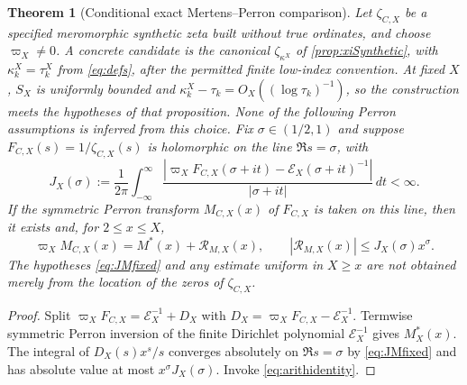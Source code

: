 \documentclass[11pt,reqno]{amsart}
\numberwithin{equation}{section}
\newtheorem{theorem}{Theorem}[section]
\begin{document}
\begin{theorem}[Conditional exact Mertens--Perron comparison]
\label{thm:PerronMfixed}
Let $\zeta_{C,X}$ be a specified meromorphic synthetic zeta
built without true ordinates, and choose $\varpi_X\ne0$.
A concrete candidate is the canonical $\zeta_{\kappa^X}$ of
\cref{prop:xiSynthetic}, with $\kappa_k^X=\tau_k^X$
from \eqref{eq:defs}, after the permitted finite low-index convention.
At fixed $X$, $S_X$ is uniformly bounded and
$\kappa_k^X-\tau_k=O_X((\log\tau_k)^{-1})$,
so the construction meets the hypotheses of that proposition.
None of the following Perron assumptions is inferred from this choice.
Fix $\sigma\in(1/2,1)$ and suppose
$F_{C,X}(s)=1/\zeta_{C,X}(s)$ is holomorphic on the line
$\Re s=\sigma$, with
\begin{equation}\label{eq:JMfixed}
 J_X(\sigma):=\frac1{2\pi}
 \int_{-\infty}^{\infty}
 \frac{|\varpi_X F_{C,X}(\sigma+it)-\mathscr E_X(\sigma+it)^{-1}|}
 {|\sigma+it|}\,dt<\infty.
\end{equation}
If the symmetric Perron transform $M_{C,X}(x)$ of $F_{C,X}$
is taken on this line, then it exists and, for $2\le x\le X$,
\begin{equation}\label{eq:PerronMfixed}
 \boxed{\varpi_X M_{C,X}(x)=M^*(x)+\mathcal R_{M,X}(x),\qquad
 |\mathcal R_{M,X}(x)|\le J_X(\sigma)x^\sigma.}
\end{equation}
The hypotheses \eqref{eq:JMfixed} and any estimate uniform in
$X\ge x$ are \emph{not} obtained merely from the location of the
zeros of $\zeta_{C,X}$.
\end{theorem}
\begin{proof}
Split $\varpi_XF_{C,X}=\mathscr E_X^{-1}+D_X$ with
$D_X=\varpi_XF_{C,X}-\mathscr E_X^{-1}$.  Termwise symmetric Perron inversion
of the finite Dirichlet polynomial $\mathscr E_X^{-1}$ gives $M_X^*(x)$.
The integral of $D_X(s)x^s/s$ converges absolutely on
$\Re s=\sigma$ by \eqref{eq:JMfixed} and has absolute value at most
$x^\sigma J_X(\sigma)$.  Invoke \eqref{eq:arithidentity}.
\end{proof}
\end{document}
